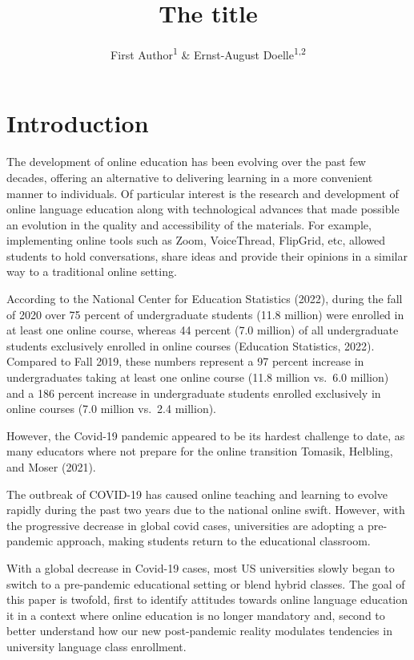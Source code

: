 \documentclass[
  man]{apa6}
\title{The title}
\author{First Author\textsuperscript{1} \& Ernst-August Doelle\textsuperscript{1,2}}
\date{}
\affiliation{\vspace{0.5cm}\textsuperscript{1} Wilhelm-Wundt-University\\\textsuperscript{2} Konstanz Business School}
\begin{document}
\maketitle

\hypertarget{introduction}{%
\section{Introduction}\label{introduction}}

The development of online education has been evolving over the past few decades, offering an alternative to delivering learning in a more convenient manner to individuals.
Of particular interest is the research and development of online language education along with technological advances that made possible an evolution in the quality and accessibility of the materials.
For example, implementing online tools such as Zoom, VoiceThread, FlipGrid, etc, allowed students to hold conversations, share ideas and provide their opinions in a similar way to a traditional online setting.

According to the National Center for Education Statistics (2022), during the fall of 2020 over 75 percent of undergraduate students (11.8 million) were enrolled in at least one online course, whereas 44 percent (7.0 million) of all undergraduate students exclusively enrolled in online courses (Education Statistics, 2022).
Compared to Fall 2019, these numbers represent a 97 percent increase in undergraduates taking at least one online course (11.8 million vs.~6.0 million) and a 186 percent increase in undergraduate students enrolled exclusively in online courses (7.0 million vs.~2.4 million).

However, the Covid-19 pandemic appeared to be its hardest challenge to date, as many educators where not prepare for the online transition Tomasik, Helbling, and Moser (2021).

The outbreak of COVID-19 has caused online teaching and learning to evolve rapidly during the past two years due to the national online swift.
However, with the progressive decrease in global covid cases, universities are adopting a pre-pandemic approach, making students return to the educational classroom.

With a global decrease in Covid-19 cases, most US universities slowly began to switch to a pre-pandemic educational setting or blend hybrid classes.
The goal of this paper is twofold, first to identify attitudes towards online language education it in a context where online education is no longer mandatory and, second to better understand how our new post-pandemic reality modulates tendencies in university language class enrollment.
\end{document}
